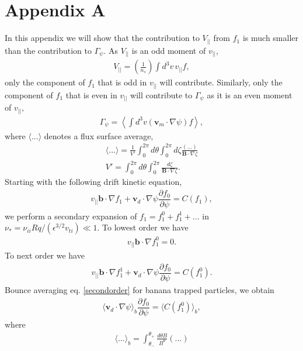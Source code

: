 \documentclass{article}
\newcommand{\partder}[2]{\dfrac{\partial  #1}{\partial  #2}} %
\begin{document}
\section{Appendix A} \label{parallelflow}
In this appendix we will show that the contribution to $V_{||}$ from $f_1$ is much smaller than the contribution to $\Gamma_{\psi}$. As $V_{||}$ is an odd moment of $v_{||}$,
\begin{gather}
V_{||} = \left(\frac{1}{n_s}\right) \int d^3 v \, v_{||} f,
\end{gather}
only the component of $f_1$ that is odd in $v_{||}$ will contribute. Similarly, only the component of $f_1$ that is even in $v_{||}$ will contribute to $\Gamma_{\psi}$ as it is an even moment of $v_{||}$,
\begin{gather}
\Gamma_{\psi} = \left \langle \int d^3v (\bm{v}_m \cdot \nabla \psi) f \right \rangle,
\end{gather}
where $\langle ... \rangle$ denotes a flux surface average,
\begin{gather}
\langle ... \rangle = \frac{1}{V'} \int_0^{2 \pi} d \theta \int_0^{2 \pi} d \zeta \frac{ (...)}{\bm{B} \cdot \nabla \zeta}
\\ V' = \int_0^{2\pi} d \theta \int_0^{2 \pi} \frac{d \zeta}{\bm{B} \cdot \nabla \zeta}.
\end{gather}
Starting with the following drift kinetic equation,
\begin{gather}
v_{||} \bm{b} \cdot \nabla f_1 + \bm{v}_d \cdot \nabla \psi \partder{f_0}{\psi} = C(f_1),
\end{gather}
we perform a secondary expansion of $f_1 = f_1^0 + f_1^1 + ...$ in $\nu_* = \nu_{ii} Rq/(\epsilon^{3/2} v_{ti}) \ll 1$. To lowest order we have
\begin{gather}
v_{||} \bm{b} \cdot \nabla f_1^0 = 0.
\end{gather}\label{firstorder}
To next order we have
\begin{gather}
v_{||} \bm{b} \cdot \nabla f_1^1 + \bm{v}_d \cdot \nabla \psi \partder{f_0}{\psi} = C(f_1^0).
\end{gather}\label{secondorder}
Bounce averaging eq. \ref{secondorder} for banana trapped particles, we obtain
\begin{gather}
\langle \bm{v}_d \cdot \nabla \psi \rangle_b \partder{f_0}{\psi} = \langle C(f_1^0) \rangle_b,
\end{gather}\label{bounceaverage}
where 
\begin{gather}
\langle ... \rangle_b = \int_{\theta_-}^{\theta_+} \frac{d \theta B}{B^{\theta}} (...)
\end{gather}
\end{document}
